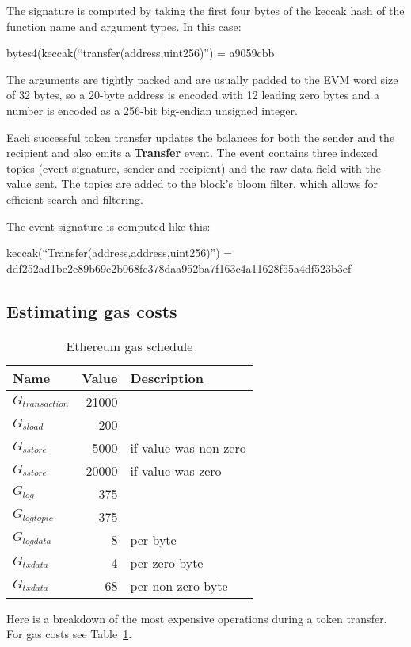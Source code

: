 \documentclass[12pt]{article}
\begin{document}
The signature is computed by taking the first four bytes of the keccak hash of the function name and argument types. In this case:
\begin{center}
	bytes4(keccak(``transfer(address,uint256)'') = a9059cbb
\end{center}

The arguments are tightly packed and are usually padded to the EVM word size of 32 bytes, so a 20-byte address is encoded with 12 leading zero bytes and a number is encoded as a 256-bit big-endian unsigned integer.

Each successful token transfer updates the balances for both the sender and the recipient and also emits a \textbf{Transfer} event.
The event contains three indexed topics (event signature, sender and recipient) and the raw data field with the value sent.
The topics are added to the block's bloom filter, which allows for efficient search and filtering.

The event signature is computed like this:
\begin{center}
	keccak(``Transfer(address,address,uint256)'') = ddf252ad1be2c89b69c2b068fc378daa952ba7f163c4a11628f55a4df523b3ef
\end{center}

\subsection{Estimating gas costs}

\begin{table}[h]
\caption{Ethereum gas schedule\cite{yellowpaper}}
\label{gas-costs}
\begin{center}
\begin{tabular}{l r l}
	Name & Value & Description \\ \hline
	$G_{transaction}$ & 21000 \\
	$G_{sload}$ & 200 \\
	$G_{sstore}$ & 5000 & if value was non-zero \\
	$G_{sstore}$ & 20000 & if value was zero \\
	$G_{log}$ & 375 \\
	$G_{logtopic}$ & 375 \\
	$G_{logdata}$ & 8 & per byte \\
	$G_{txdata}$ & 4 & per zero byte \\
	$G_{txdata}$ & 68 & per non-zero byte \\
\end{tabular}
\end{center}
\end{table}
%
Here is a breakdown of the most expensive operations during a token transfer. For gas costs see Table~\ref{gas-costs}.
\end{document}
